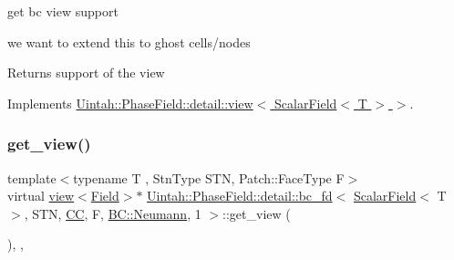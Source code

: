 get bc view support 

we want to extend this to ghost cells/nodes

\begin{DoxyReturn}{Returns}
support of the view 
\end{DoxyReturn}


Implements \hyperlink{classUintah_1_1PhaseField_1_1detail_1_1view_3_01ScalarField_3_01T_01_4_01_4_a3e14b0c7a57a57707bb33954861ab1c1}{Uintah\+::\+Phase\+Field\+::detail\+::view$<$ Scalar\+Field$<$ T $>$ $>$}.

\mbox{\label{classUintah_1_1PhaseField_1_1detail_1_1bc__fd_3_01ScalarField_3_01T_01_4_00_01STN_00_01CC_00_01F_00_01BC_1_1Neumann_00_011_01_4_ae067158c4bde7162f906999a1eb7c4e8}} 
\subsubsection{\texorpdfstring{get\+\_\+view()}{get\_view()}\hspace{0.1cm}{\footnotesize\ttfamily [1/2]}}
{\footnotesize\ttfamily template$<$typename T , Stn\+Type S\+TN, Patch\+::\+Face\+Type F$>$ \\
virtual \hyperlink{classUintah_1_1PhaseField_1_1detail_1_1view}{view}$<$\hyperlink{structUintah_1_1PhaseField_1_1ScalarField}{Field}$>$$\ast$ \hyperlink{classUintah_1_1PhaseField_1_1detail_1_1bc__fd}{Uintah\+::\+Phase\+Field\+::detail\+::bc\+\_\+fd}$<$ \hyperlink{structUintah_1_1PhaseField_1_1ScalarField}{Scalar\+Field}$<$ T $>$, S\+TN, \hyperlink{namespaceUintah_1_1PhaseField_a33d355affda78a83f45755ba8388cedda22303704507d024d1d6508ed9859a85a}{CC}, F, \hyperlink{namespaceUintah_1_1PhaseField_a148fba372aa3be96fd6eede7a2fa10b5ab8537a769dbc90cb1762215441212152}{B\+C\+::\+Neumann}, 1 $>$\+::get\+\_\+view (\begin{DoxyParamCaption}{ }\end{DoxyParamCaption})\hspace{0.3cm}{\ttfamily [inline]}, {\ttfamily [override]}, {\ttfamily [virtual]}}



